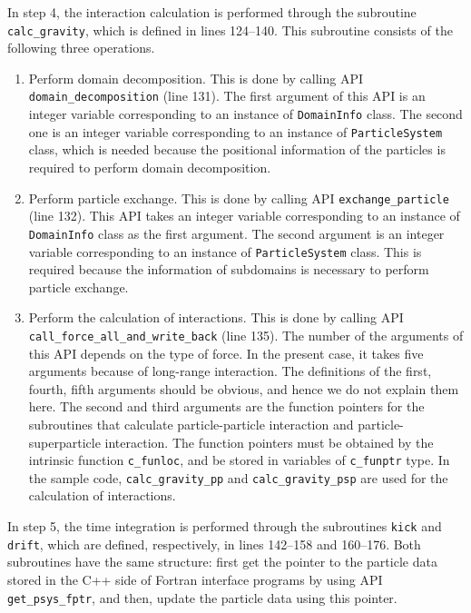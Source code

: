 \documentclass[twocolumn,useamsfonts]{pasj01}
\begin{document}
In step 4, the interaction calculation is performed through the subroutine \texttt{calc\_gravity}, which is defined in lines 124--140. This subroutine consists of the following three operations.
\begin{enumerate}[label=(\roman*)]
\item Perform domain decomposition. This is done by calling API \texttt{domain\_decomposition} (line 131). The first argument of this API is an integer variable corresponding to an instance of \texttt{DomainInfo} class. The second one is an integer variable corresponding to an instance of \texttt{ParticleSystem} class, which is needed because the positional information of the particles is required to perform domain decomposition.  
\item Perform particle exchange. This is done by calling API \texttt{exchange\_particle} (line 132). This API takes an integer variable corresponding to an instance of \texttt{DomainInfo} class as the first argument. The second argument is an integer variable corresponding to an instance of \texttt{ParticleSystem} class. This is required because the information of subdomains is necessary to perform particle exchange.
\item Perform the calculation of interactions. This is done by calling API \texttt{call\_force\_all\_and\_write\_back} (line 135). The number of the arguments of this API depends on the type of force. In the present case, it takes five arguments because of long-range interaction. The definitions of the first, fourth, fifth arguments should be obvious, and hence we do not explain them here. The second and third arguments are the function pointers for the subroutines that calculate particle-particle interaction and particle-superparticle interaction. The function pointers must be obtained by the intrinsic function \texttt{c\_funloc}, and be stored in variables of \texttt{c\_funptr} type. In the sample code, \texttt{calc\_gravity\_pp} and \texttt{calc\_gravity\_psp} are used for the calculation of interactions.
\end{enumerate}


In step 5, the time integration is performed through the subroutines \texttt{kick} and \texttt{drift}, which are defined, respectively, in lines 142--158 and 160--176. Both subroutines have the same structure: first get the pointer to the particle data stored in the C++ side of Fortran interface programs by using API \texttt{get\_psys\_fptr}, and then, update the particle data using this pointer.
\end{document}

